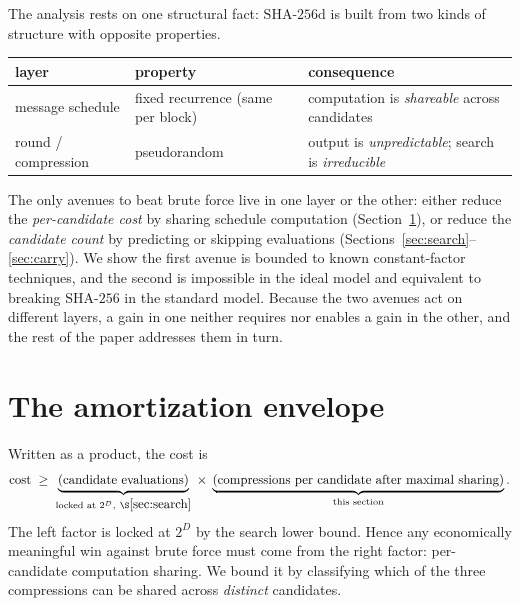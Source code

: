 \documentclass[11pt]{article}
\theoremstyle{remark}
\newcommand{\SHA}{\mathrm{SHA\text{-}256}}
\newcommand{\SHAd}{\mathrm{SHA\text{-}256d}}
\begin{document}
The analysis rests on one structural fact: $\SHAd$ is built from two
kinds of structure with opposite properties.

\begin{center}
\begin{tabular}{ll p{}}
\hline
\textbf{layer} & \textbf{property} & \textbf{consequence}\\
\hline
message schedule & fixed recurrence (same per block) & computation is \emph{shareable} across candidates\\
round / compression & pseudorandom & output is \emph{unpredictable}; search is \emph{irreducible}\\
\hline
\end{tabular}
\end{center}

The only avenues to beat brute force live in one layer or the other:
either reduce the \emph{per-candidate cost} by sharing schedule
computation (Section~\ref{sec:amort}), or reduce the \emph{candidate
count} by predicting or skipping evaluations
(Sections~\ref{sec:search}--\ref{sec:carry}). We show the first avenue is
bounded to known constant-factor techniques, and the second is
impossible in the ideal model and equivalent to breaking $\SHA$ in the
standard model. Because the two avenues act on different layers, a gain
in one neither requires nor enables a gain in the other, and the rest of
the paper addresses them in turn.

\section{The amortization envelope}\label{sec:amort}

Written as a product, the cost is
\[
  \text{cost} \;\ge\;
  \underbrace{(\text{candidate evaluations})}_{\text{locked at }2^D,\ \S\ref{sec:search}}
  \;\times\;
  \underbrace{(\text{compressions per candidate after maximal sharing})}_{\text{this section}}.
\]
The left factor is locked at $2^{D}$ by the search lower bound. Hence any
economically meaningful win against brute force must come from the right
factor: per-candidate computation sharing. We bound it by classifying
which of the three compressions can be shared across \emph{distinct}
candidates.
\end{document}
